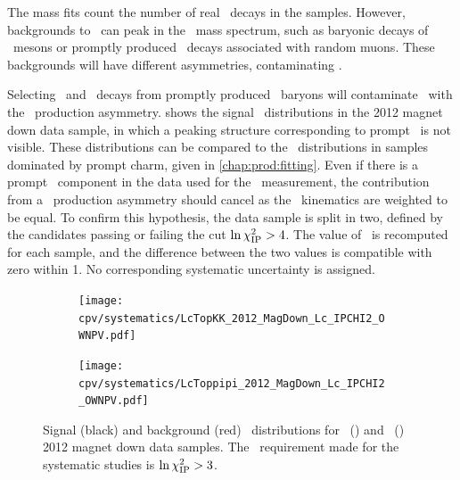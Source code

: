 The mass fits count the number of real \PLambdac\ decays in the samples.
However, backgrounds to \LbToLcmuX\ can peak in the \PLambdac\ mass spectrum, 
such as baryonic decays of \PB\ mesons or promptly produced \PLambdac\ decays 
associated with random muons.
These backgrounds will have different asymmetries, contaminating \dACP\@.

Selecting \pKK\ and \ppipi\ decays from promptly produced \PLambdac\ baryons 
will contaminate \dACP\ with the \PLambdac\ production asymmetry.
 shows the signal \lnipchisq\ distributions in the 
2012 magnet down data sample, in which a peaking structure corresponding to 
prompt \PLambdac\ is not visible.
These distributions can be compared to the \lnipchisq\ distributions in samples 
dominated by prompt charm, given in \cref{chap:prod:fitting}.
Even if there is a prompt \PLambdac\ component in the data used for the \dACP\ 
measurement, the contribution from a \PLambdac\ production asymmetry should 
cancel as the \PLambdac\ kinematics are weighted to be equal.
To confirm this hypothesis, the data sample is split in two, defined by the 
candidates passing or failing the cut $\ln\chi^2_{\textnormal{IP}} > 4$.
The value of \dACP\ is recomputed for each sample, and the difference between 
the two values is compatible with zero within \SI{1}{\sigma}.
No corresponding systematic uncertainty is assigned.

\begin{figure}
  \begin{subfigure}[b]{0.5\textwidth}
    \texttt{[image: cpv/systematics/LcTopKK\_2012\_MagDown\_Lc\_IPCHI2\_OWNPV.pdf]}
    \caption{\pKK}
    \label{fig:cpv:syst:ipchisq:pKK}
  \end{subfigure}
  \begin{subfigure}[b]{0.5\textwidth}
    \texttt{[image: cpv/systematics/LcToppipi\_2012\_MagDown\_Lc\_IPCHI2\_OWNPV.pdf]}
    \caption{\ppipi}
    \label{fig:cpv:syst:ipchisq:ppipi}
  \end{subfigure}
  \caption{%
    Signal (black) and background (red) \lnipchisq\ distributions for 
    \pKK~(\subref*{fig:cpv:syst:ipchisq:pKK}) and 
    \ppipi~() 2012 magnet down data 
    samples.
    The \lnipchisq\ requirement made for the systematic studies is $\ln\chi^2_{\textnormal{IP}} 
    > 3$.
  }
  \label{fig:cpv:syst:ipchisq}
\end{figure}

